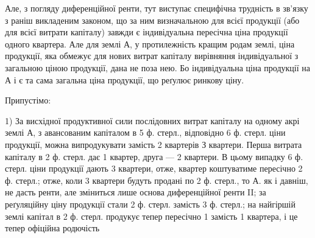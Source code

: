 Але, з погляду диференційної ренти, тут виступає специфічна трудність
в зв’язку з раніш викладеним законом, що за ним визначальною для всієї продукції
(або для всієї витрати капіталу) завжди є індивідуальна пересічна ціна
продукції одного квартера. Але для землі А, у протилежність кращим родам
землі, ціна продукції, яка обмежує для нових витрат капіталу вирівняння індивідуальної
з загальною ціною продукції, дана не поза нею. Бо індивідуальна ціна
продукції на А і є та сама загальна ціна продукції, що реґулює ринкову ціну.

Припустімо:

1) За висхідної продуктивної сили послідовних витрат
капіталу на одному акрі землі А, з авансованим капіталом в 5 ф. стерл.,
відповідно 6 ф. стерл. ціни продукції, можна випродукувати замість 2 квартерів
З квартери. Перша витрата капіталу в 2 ф. стерл. дає 1 квартер, друга — 2 квартери. В цьому
випадку 6 ф. стерл. ціни продукції дають 3 квартери,
отже, квартер коштуватиме пересічно 2 ф. стерл.; отже, коли 3 квартери
будуть продані по 2 ф. стерл., то А. як і давніш, не дасть ренти, але зміниться
лише основа диференційної ренти II; за реґуляційну ціну продукції стали
2 ф. стерл. замість 3 ф. стерл.; на найгіршій землі капітал в 2  ф. стерл.
продукує тепер пересічно 1  замість 1 квартера, і це тепер офіційна родючість
\parbreak{}  %

